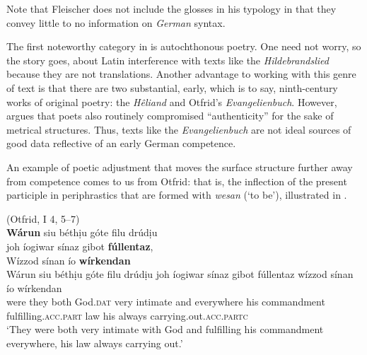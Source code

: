 \noindent Note that Fleischer does not include the glosses in his typology in that they convey little to no information on \textit{German} syntax.

The first noteworthy category in  is autochthonous poetry. One need not worry, so the story goes, about Latin interference with texts like the \textit{Hildebrandslied} because they are not translations. Another advantage to working with this genre of text is that there are two substantial, early, which is to say, ninth-century works of original poetry: the \textit{Hêliand} and Otfrid’s \textit{Evangelienbuch}. However, \citet[35--37, 42]{Fleischer2006} argues that poets also routinely compromised “authenticity” for the sake of metrical structures. Thus, texts like the \textit{Evangelienbuch} are not ideal sources of good data reflective of an early German competence.

An example of poetic adjustment that moves the surface structure further away from competence comes to us from Otfrid: that is, the inflection of the present participle in periphrastics that are formed with \textit{wesan} (‘to be’), illustrated in .

\ea\label{ex:2:3}%
(Otfrid, I 4, 5--7)\medskip\\
\textbf{Wárun} siu béthịu \qquad     góte filu drúdịu \\
joh íogiwar sínaz \qquad     gibot \textbf{fúllentaz}, \\
Wízzod sínan  \qquad    ío \textbf{wírkendan}\medskip\\
\gll Wárun  siu    béthịu  góte                filu    drúdịu  joh  íogiwar     sínaz      gibot fúllentaz        wízzod  sínan      ío    wírkendan\\
     were  they    both  God.\textsc{dat}    very  intimate and  everywhere  his    commandment fulfilling{}.\textsc{acc.part}  law     his    always   carrying.out.\textsc{acc.partc}\\
\glt `They were both very intimate with God and fulfilling his commandment everywhere, his law always carrying out.'
\z

